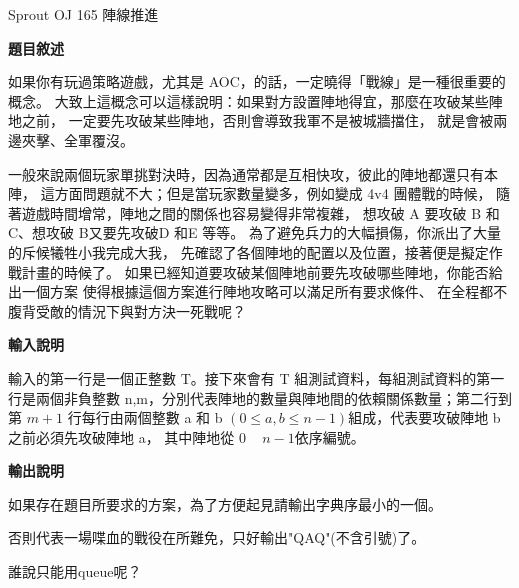     \problem Sprout OJ 165 陣線推進

    \textbf{題目敘述}

    如果你有玩過策略遊戲，尤其是 AOC，的話，一定曉得「戰線」是一種很重要的概念。
    大致上這概念可以這樣說明：如果對方設置陣地得宜，那麼在攻破某些陣地之前，
    一定要先攻破某些陣地，否則會導致我軍不是被城牆擋住，
    就是會被兩邊夾擊、全軍覆沒。

    一般來說兩個玩家單挑對決時，因為通常都是互相快攻，彼此的陣地都還只有本陣，
    這方面問題就不大；但是當玩家數量變多，例如變成 4v4 團體戰的時候，
    隨著遊戲時間增常，陣地之間的關係也容易變得非常複雜，
    想攻破 A 要攻破 B 和 C、想攻破 B又要先攻破D 和E 等等。
    為了避免兵力的大幅損傷，你派出了大量的斥候犧牲小我完成大我，
    先確認了各個陣地的配置以及位置，接著便是擬定作戰計畫的時候了。
    如果已經知道要攻破某個陣地前要先攻破哪些陣地，你能否給出一個方案
    使得根據這個方案進行陣地攻略可以滿足所有要求條件、
    在全程都不腹背受敵的情況下與對方決一死戰呢？

    \textbf{輸入說明}

    輸入的第一行是一個正整數 T。接下來會有 
    T 組測試資料，每組測試資料的第一行是兩個非負整數 
    n,m，分別代表陣地的數量與陣地間的依賴關係數量；第二行到第 
    $m+1$ 行每行由兩個整數 a 和 b $(0\le a,b \le n-1)$組成，代表要攻破陣地 b 之前必須先攻破陣地 a，
    其中陣地從 $0$ ~ $n-1$依序編號。

    \textbf{輸出說明}

    如果存在題目所要求的方案，為了方便起見請輸出字典序最小的一個。

    否則代表一場喋血的戰役在所難免，只好輸出"QAQ"(不含引號)了。

    \begin{tip}
        誰說只能用queue呢？
    \end{tip}

    